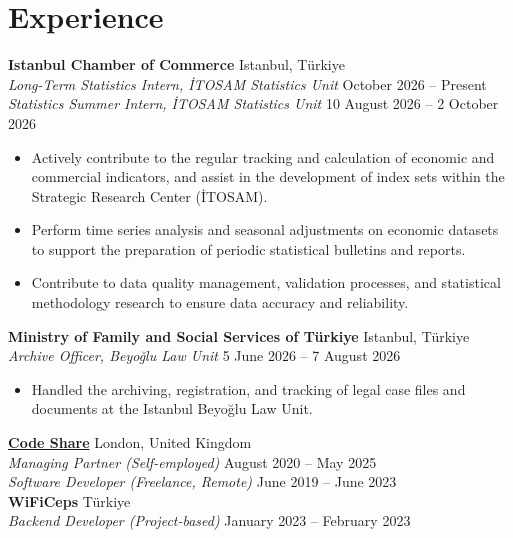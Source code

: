 \documentclass[10pt,a4paper]{extarticle}
\begin{document}
\section{Experience}
\textbf{Istanbul Chamber of Commerce} \hfill Istanbul, Türkiye\\
\textit{Long-Term Statistics Intern, İTOSAM Statistics Unit} \hfill October 2026 -- Present\\
\textit{Statistics Summer Intern, İTOSAM Statistics Unit} \hfill 10 August 2026 -- 2 October 2026
\begin{itemize}[leftmargin=*,noitemsep,topsep=0pt]
    \item Actively contribute to the regular tracking and calculation of economic and commercial indicators, and assist in the development of index sets within the Strategic Research Center (İTOSAM).
    \item Perform time series analysis and seasonal adjustments on economic datasets to support the preparation of periodic statistical bulletins and reports.
    \item Contribute to data quality management, validation processes, and statistical methodology research to ensure data accuracy and reliability.
\end{itemize}
\textbf{Ministry of Family and Social Services of Türkiye} \hfill Istanbul, Türkiye\\
\textit{Archive Officer, Beyoğlu Law Unit} \hfill 5 June 2026 -- 7 August 2026
\begin{itemize}[leftmargin=*,noitemsep,topsep=0pt]
    \item Handled the archiving, registration, and tracking of legal case files and documents at the Istanbul Beyoğlu Law Unit.
\end{itemize}
\textbf{\href{https://codeshare.me}{Code Share}} \hfill London, United Kingdom\\
\textit{Managing Partner (Self-employed)} \hfill August 2020 -- May 2025\\
\textit{Software Developer (Freelance, Remote)} \hfill June 2019 -- June 2023\\[6pt]
\textbf{WiFiCeps} \hfill Türkiye\\
\textit{Backend Developer (Project-based)} \hfill January 2023 -- February 2023
\end{document}
